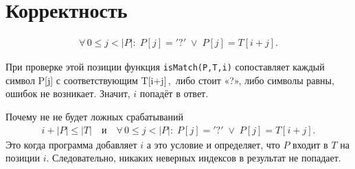 \documentclass[a4paper,12pt]{article}
\begin{document}
\section*{Корректность}



\begin{gather*}
    \forall\,0 \le j < |P|\colon\;
    P[j] = '?' \;\lor\; P[j] = T[i+j].
\end{gather*}


При проверке этой позиции функция \texttt{isMatch(P,T,i)} сопоставляет каждый символ
P[j] с соответствующим T[i+j]\,,\ {либо стоит «?», либо символы равны,
ошибок не возникает.} Значит, \(i\) попадёт в ответ.


\textbf{}{Почему не не будет ложных срабатываний}
\begin{gather*}
    i + |P| \le |T|
    \quad\text{и}\quad
    \forall\,0 \le j < |P|\colon\;
    P[j] = '?' \;\lor\; P[j] = T[i+j].
\end{gather*}
Это когда программа добавляет \(i\) а это условие и определяет, что \(P\) 
входит в \(T\) на позиции \(i\). Следовательно, никаких неверных индексов в результат не попадает.
\end{document}
